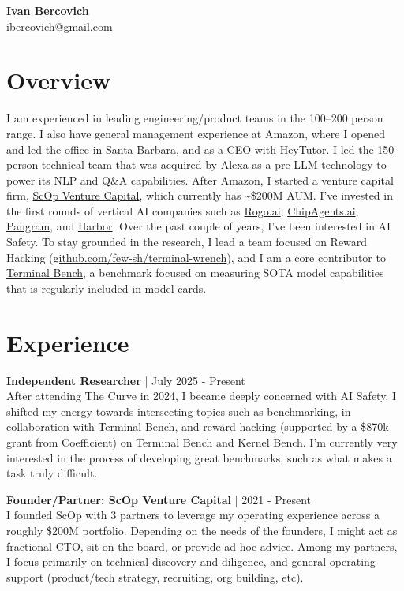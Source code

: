 \documentclass[a4paper,10pt]{article}
\begin{document}
\noindent
\textbf{\Large Ivan Bercovich} \\
\href{mailto:ibercovich@gmail.com}{ibercovich@gmail.com} \\
\vspace{0cm}

\section*{Overview}
\noindent
I am experienced in leading engineering/product teams in the 100--200 person range. I also have general management experience at Amazon, where I opened and led the office in Santa Barbara, and as a CEO with HeyTutor. I led the 150-person technical team that was acquired by Alexa as a pre-LLM technology to power its NLP and Q\&A capabilities. After Amazon, I started a venture capital firm, \href{https://www.scopvc.com}{ScOp Venture Capital}, which currently has \textasciitilde\$200M AUM. I've invested in the first rounds of vertical AI companies such as \href{https://www.rogo.ai}{Rogo.ai}, \href{https://www.chipagents.ai}{ChipAgents.ai}, \href{https://www.pangram.com}{Pangram}, and \href{https://harborframework.com}{Harbor}. Over the past couple of years, I've been interested in AI Safety. To stay grounded in the research, I lead a team focused on Reward Hacking (\href{https://github.com/few-sh/terminal-wrench}{github.com/few-sh/terminal-wrench}), and I am a core contributor to \href{https://www.tbench.ai/}{Terminal Bench}, a benchmark focused on measuring SOTA model capabilities that is regularly included in model cards.

\section*{Experience}

\noindent
\textbf{Independent Researcher} | July 2025 - Present \\
After attending The Curve in 2024, I became deeply concerned with AI Safety. I shifted my energy towards intersecting topics such as benchmarking, in collaboration with Terminal Bench, and reward hacking (supported by a \$870k grant from Coefficient) on Terminal Bench and Kernel Bench. I'm currently very interested in the process of developing great benchmarks, such as what makes a task truly difficult.

\vspace{5pt} %

\noindent
\textbf{Founder/Partner: ScOp Venture Capital} | 2021 - Present \\
I founded ScOp with 3 partners to leverage my operating experience across a roughly \$200M portfolio. Depending on the needs of the founders, I might act as fractional CTO, sit on the board, or provide ad-hoc advice. Among my partners, I focus primarily on technical discovery and diligence, and general operating support (product/tech strategy, recruiting, org building, etc).
\end{document}
